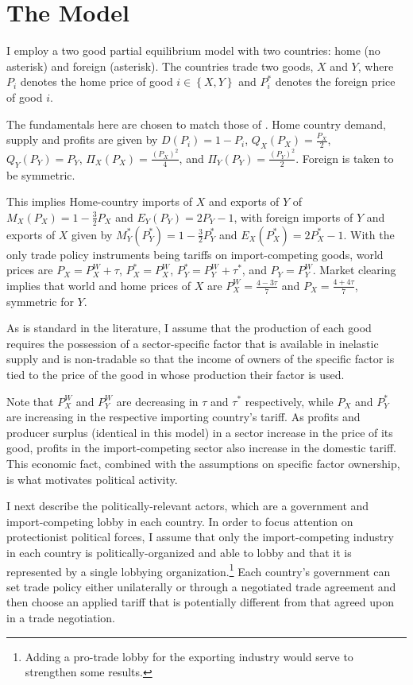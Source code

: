 \documentclass[12pt]{article}
\begin{document}
\section{The Model}
\label{sec:stage}
I employ a two good partial equilibrium model with two countries: home (no asterisk) and foreign (asterisk).  The countries trade two goods, $X$ and $Y$, where $P_i$ denotes the home price of good $i \in \left\{X,Y\right\}$ and $P_i^*$ denotes the foreign price of good $i$.

The fundamentals here are chosen to match those of \Textcite{bs2001,bs2005}. Home country demand, supply and profits are given by $D(P_i) = 1 - P_i$, $Q_X(P_X) = \frac{P_X}{2}$, $Q_Y(P_Y) = P_Y$, $\Pi_X(P_X) = \frac{(P_X)^2}{4}$, and $\Pi_Y(P_Y) = \frac{(P_Y)^2}{2}$. %
Foreign is taken to be symmetric.

This implies Home-country imports of $X$ and exports of $Y$ of $M_X(P_X)= 1 - \frac{3}{2}P_X$ and $E_Y(P_Y)= 2P_Y -1$, with foreign imports of $Y$ and exports of $X$ given by $M_Y^*(P_Y^*)= 1 - \frac{3}{2}P_Y^*$ and $E_X(P_X^*)= 2P_X^* -1$. With the only trade policy instruments being tariffs on import-competing goods, world prices are $P_X = P_X^W + \tau$, $P_X^* = P_X^W$, $P_Y^* = P_Y^W + \tau^*$, and $P_Y = P_Y^W$. Market clearing implies that world and home prices of $X$ are $P_X^W = \frac{4-3\tau}{7}$ and $P_X = \frac{4+4\tau}{7}$, symmetric for $Y$.

As is standard in the literature, I assume that the production of each good requires the possession of a sector-specific factor that is available in inelastic supply and is non-tradable so that the income of owners of the specific factor is tied to the price of the good in whose production their factor is used. 

Note that $P_X^W$ and $P_Y^W$ are decreasing in $\tau$ and $\tau^*$ respectively, while $P_X$ and $P_Y^*$ are increasing in the respective importing country's tariff. As profits and producer surplus (identical in this model) in a sector increase in the price of its good, profits in the import-competing sector also increase in the domestic tariff. This economic fact, combined with the assumptions on specific factor ownership, is what motivates political activity.

I next describe the politically-relevant actors, which are a government and import-competing lobby in each country. In order to focus attention on protectionist political forces, I assume that only the import-competing industry in each country is politically-organized and able to lobby and that it is represented by a single lobbying organization.\footnote{Adding a pro-trade lobby for the exporting industry would serve to strengthen some results.} Each country's government can set trade policy either unilaterally or through a negotiated trade agreement and then choose an applied tariff that is potentially different from that agreed upon in a trade negotiation.
\end{document}
